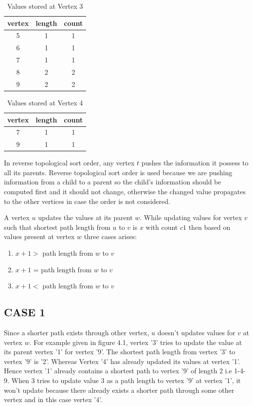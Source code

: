\begin{table}[h!]
\centering
\begin{tabular}{|c|c|c|}
\hline
vertex & length & count \\
\hline
5 & 1 & 1 \\ 
\hline
6 & 1 & 1 \\ 
\hline
7 & 1 & 1 \\ 
\hline
8 & 2 & 2 \\ 
\hline
9 & 2 & 2 \\ 
\hline
\end{tabular}
\caption{Values stored at Vertex 3}
\label{tab:data3}
\end{table}




\begin{table}[h!]
\centering
\begin{tabular}{|c|c|c|}
\hline
vertex & length & count \\
\hline
7 & 1 & 1 \\ 
\hline
9 & 1 & 1 \\ 
\hline
\end{tabular}
\caption{Values stored at Vertex 4}
\label{tab:data4}
\end{table}




In reverse topological sort order, any vertex $t$ pushes the information it possess to all its parents. Reverse topological sort order is used because we are pushing information from a child to a parent so the child's information should be computed first and it should not change, otherwise the changed value propagates to the other vertices in case the order is not considered. 

A vertex $u$ updates the values at its parent $w$.
While updating values for vertex $v$ such that shortest path length from $u$ to $v$ is $x$ with count $c1$ then based on values present at vertex $w$ three cases arises:
\begin{enumerate}
\item  $x + 1 >$ path length from $w$ to $v$
\item  $x + 1$ = path length from $w$ to $v$
\item  $x + 1 <$ path length from $w$ to $v$
\end{enumerate}
\vspace{-2.0em}
\subsection{CASE 1}
\vspace{-1.0em}
Since a shorter path exists through other vertex, $u$ doesn't updates values for $v$ at vertex $w$.
For example given in figure 4.1, vertex '3' tries to update the value at its parent vertex '1' for vertex '9'. The shortest path length from vertex '3' to vertex '9' is  '2'. Whereas Vertex '4' has already updated its values at vertex '1'. Hence vertex '1' already contains a shortest path to  vertex '9' of length 2 i.e 1-4-9. When 3 tries to update value 3 as a path length to vertex '9' at vertex '1', it won't update because there already exists a shorter path through some other vertex and in this case vertex '4'. 

